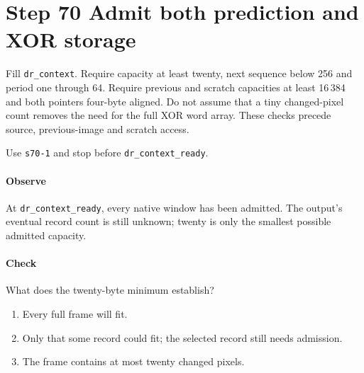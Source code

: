 \section{Step 70 Admit both prediction and XOR storage}
Fill \texttt{dr\_context}. Require capacity at least twenty, next sequence below 256 and period one through 64. Require previous and scratch capacities at least 16\,384 and both pointers four-byte aligned. Do not assume that a tiny changed-pixel count removes the need for the full XOR word array. These checks precede source, previous-image and scratch access.

Use \texttt{s70-1} and stop before \texttt{dr\_context\_ready}.

\paragraph{Observe} At \texttt{dr\_context\_ready}, every native window has been admitted. The output's eventual record count is still unknown; twenty is only the smallest possible admitted capacity.

\paragraph{Check} What does the twenty-byte minimum establish?
\begin{enumerate}[label=\Alph*.]
  \item Every full frame will fit.
  \item Only that some record could fit; the selected record still needs admission.
  \item The frame contains at most twenty changed pixels.
\end{enumerate}
